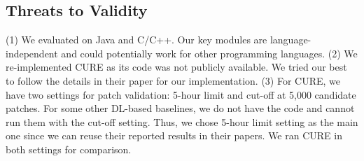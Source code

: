 \subsection{Threats to Validity}




(1) We evaluated {\tool} on Java and C/C++. Our key modules are
language-independent and could potentially work for other programming
languages. (2) We re-implemented CURE as its code was not publicly
available.
We tried our best to follow the details in their paper for our
implementation.
(3) For CURE, we have two settings for patch validation: 5-hour limit
and cut-off at 5,000 candidate patches. For some other DL-based
baselines, we do not have the code and cannot run them with the
cut-off setting. Thus, we chose 5-hour limit setting as the main one
since we can reuse their reported results in their papers. We ran
CURE in both settings for comparison.




